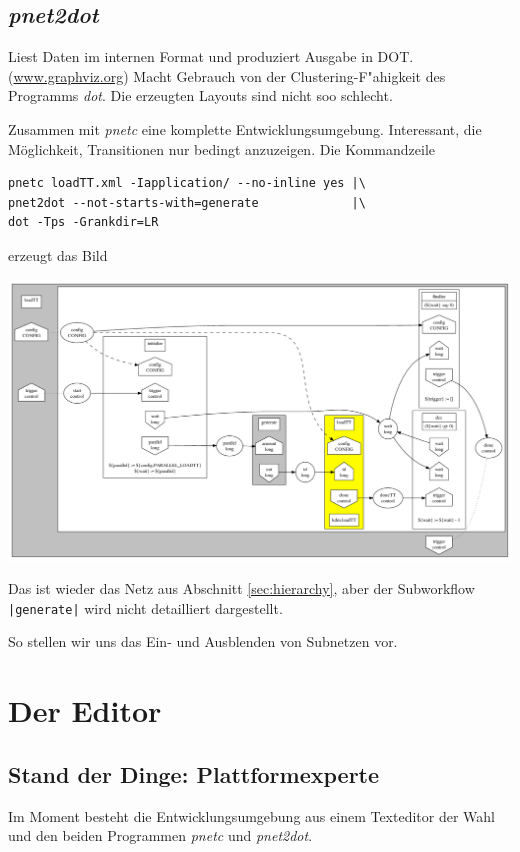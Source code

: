 \documentclass[a4paper,12pt]{article}
\newlength{\st}\setlength{\st}{0pt}
\newcommand{\program}[1]{\textit{#1}}
\newcommand{\transition}[1]{\texttt{|#1|}}
\begin{document}
\subsection{\program{pnet2dot}}\label{sec:pnet2dot}

Liest Daten im internen Format und produziert Ausgabe in
DOT. (\url{www.graphviz.org}) Macht Gebrauch von der
Clustering-F"ahigkeit des Programms \program{dot}. Die erzeugten
Layouts sind nicht soo schlecht.

Zusammen mit \program{pnetc} eine komplette
Entwicklungsumgebung. Interessant, die M\"oglichkeit, Transitionen nur
bedingt anzuzeigen. Die Kommandzeile
\begin{verbatim}
pnetc loadTT.xml -Iapplication/ --no-inline yes |\
pnet2dot --not-starts-with=generate             |\
dot -Tps -Grankdir=LR
\end{verbatim}
erzeugt das Bild
\begin{center}
\includegraphics[width=\textwidth]{loadTT_concept.pdf}
\end{center}
Das ist wieder das Netz aus Abschnitt \ref{sec:hierarchy}, aber der
Subworkflow \transition{generate} wird nicht detailliert dargestellt.

So stellen wir uns das Ein- und Ausblenden von Subnetzen vor.

\section{Der Editor}

\subsection{Stand der Dinge: Plattformexperte}\label{sec:use:today}

Im Moment besteht die Entwicklungsumgebung aus einem Texteditor der
Wahl und den beiden Programmen \program{pnetc} und \program{pnet2dot}.
\end{document}
